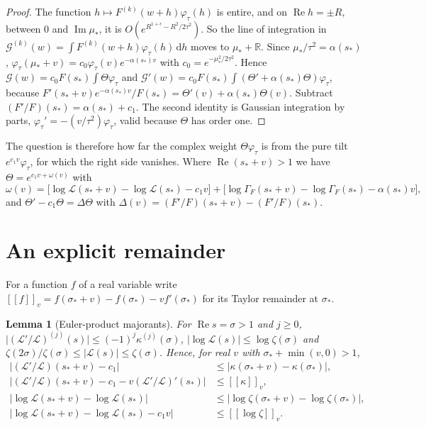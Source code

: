 \documentclass[11pt]{article}
\newtheorem{lemma}[theorem]{Lemma}
\theoremstyle{definition}
\theoremstyle{remark}
\newcommand{\R}{\mathbb R}
\newcommand{\dd}{\,\mathrm d}
\newcommand{\cG}{\mathcal G}
\newcommand{\cL}{\mathcal L}
\newcommand{\Rem}[1]{[\![#1]\!]}
\newcommand{\re}{\operatorname{Re}}
\newcommand{\im}{\operatorname{Im}}
\numberwithin{equation}{section}
\begin{document}
\begin{proof}
The function $h\mapsto F^{(k)}(w+h)\varphi_\tau(h)$ is entire, and on
$\re h=\pm R$, between $0$ and $\im\mu_*$, it is
$O(e^{R^{1+\epsilon}-R^2/2\tau^2})$. So the line of integration in
$\cG^{(k)}(w)=\int F^{(k)}(w+h)\varphi_\tau(h)\dd h$ moves to
$\mu_*+\R$. Since $\mu_*/\tau^2=\alpha(s_*)$,
$\varphi_\tau(\mu_*+v)=c_0\varphi_\tau(v)e^{-\alpha(s_*)v}$ with
$c_0=e^{-\mu_*^2/2\tau^2}$. Hence $\cG(w)=c_0F(s_*)\int\Theta\varphi_\tau$
and $\cG'(w)=c_0F(s_*)\int(\Theta'+\alpha(s_*)\Theta)\varphi_\tau$, because
$F'(s_*+v)e^{-\alpha(s_*)v}/F(s_*)=\Theta'(v)+\alpha(s_*)\Theta(v)$.
Subtract $(F'/F)(s_*)=\alpha(s_*)+c_1$. The second identity is Gaussian
integration by parts, $\varphi_\tau'=-(v/\tau^2)\varphi_\tau$, valid because
$\Theta$ has order one.
\end{proof}

The question is therefore how far the complex weight $\Theta\varphi_\tau$
is from the pure tilt $e^{c_1v}\varphi_\tau$, for which the right side
vanishes. Where $\re(s_*+v)>1$ we have $\Theta=e^{c_1v+\omega(v)}$ with
\[
\omega(v)=\bigl[\log\cL(s_*+v)-\log\cL(s_*)-c_1v\bigr]+\bigl[\log\Gamma_F(s_*+v)-\log\Gamma_F(s_*)-\alpha(s_*)v\bigr],
\]
and $\Theta'-c_1\Theta=\Delta\Theta$ with
$\Delta(v)=(F'/F)(s_*+v)-(F'/F)(s_*)$.

\section{An explicit remainder}\label{sec:remainder}

For a function $f$ of a real variable write
$\Rem{f}_v=f(\sigma_*+v)-f(\sigma_*)-vf'(\sigma_*)$ for its Taylor
remainder at $\sigma_*$.

\begin{lemma}[Euler-product majorants]\label{lem:euler}
For $\re s=\sigma>1$ and $j\ge0$,
$\lvert(\cL'/\cL)^{(j)}(s)\rvert\le(-1)^j\kappa^{(j)}(\sigma)$,
$\lvert\log\cL(s)\rvert\le\log\zeta(\sigma)$ and
$\zeta(2\sigma)/\zeta(\sigma)\le\lvert\cL(s)\rvert\le\zeta(\sigma)$. Hence,
for real $v$ with $\sigma_*+\min(v,0)>1$,
\begin{align*}
\lvert(\cL'/\cL)(s_*+v)-c_1\rvert&\le\lvert\kappa(\sigma_*+v)-\kappa(\sigma_*)\rvert,\\
\lvert(\cL'/\cL)(s_*+v)-c_1-v(\cL'/\cL)'(s_*)\rvert&\le\Rem{\kappa}_v,\\
\lvert\log\cL(s_*+v)-\log\cL(s_*)\rvert&\le\lvert\log\zeta(\sigma_*+v)-\log\zeta(\sigma_*)\rvert,\\
\lvert\log\cL(s_*+v)-\log\cL(s_*)-c_1v\rvert&\le\Rem{\log\zeta}_v .
\end{align*}
\end{lemma}
\end{document}

